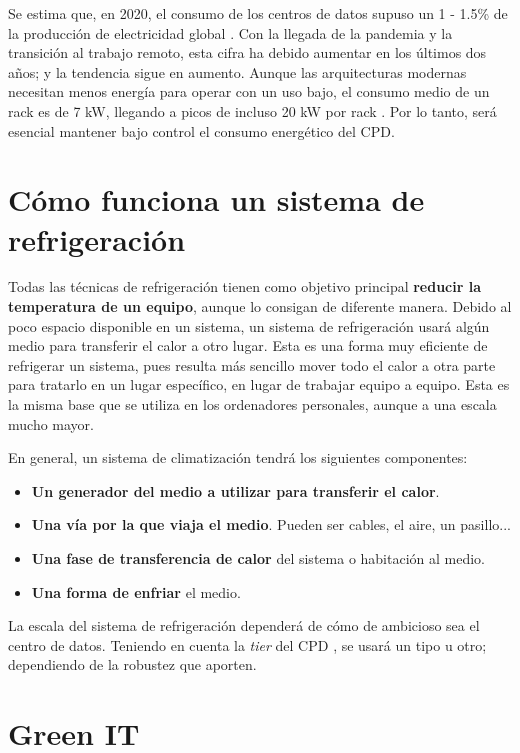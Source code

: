 Se estima que, en 2020, el consumo de los centros de datos supuso un 1 - 1.5\% de la producción de electricidad global \cite{mytton-dc}. Con la llegada de la pandemia y la transición al trabajo remoto, esta cifra ha debido aumentar en los últimos dos años; y la tendencia sigue en aumento. Aunque las arquitecturas modernas necesitan menos energía para operar con un uso bajo, el consumo medio de un rack es de 7 kW, llegando a picos de incluso 20 kW por rack \cite{datacenters-density}. Por lo tanto, será esencial mantener bajo control el consumo energético del CPD. 

\section{Cómo funciona un sistema de refrigeración}

Todas las técnicas de refrigeración tienen como objetivo principal \textbf{reducir la temperatura de un equipo}, aunque lo consigan de diferente manera. Debido al poco espacio disponible en un sistema, un sistema de refrigeración usará algún medio para transferir el calor a otro lugar. Esta es una forma muy eficiente de refrigerar un sistema, pues resulta más sencillo mover todo el calor a otra parte para tratarlo en un lugar específico, en lugar de trabajar equipo a equipo. Esta es la misma base que se utiliza en los ordenadores personales, aunque a una escala mucho mayor.

En general, un sistema de climatización tendrá los siguientes componentes:

\begin{itemize}
    \item \textbf{Un generador del medio a utilizar para transferir el calor}.
    \item \textbf{Una vía por la que viaja el medio}. Pueden ser cables, el aire, un pasillo...
    \item \textbf{Una fase de transferencia de calor} del sistema o habitación al medio.
    \item \textbf{Una forma de enfriar} el medio.
\end{itemize}

La escala del sistema de refrigeración dependerá de cómo de ambicioso sea el centro de datos. Teniendo en cuenta la \textit{tier} del CPD \cite{cofrico}, se usará un tipo u otro; dependiendo de la robustez que aporten.

\section{Green IT}

